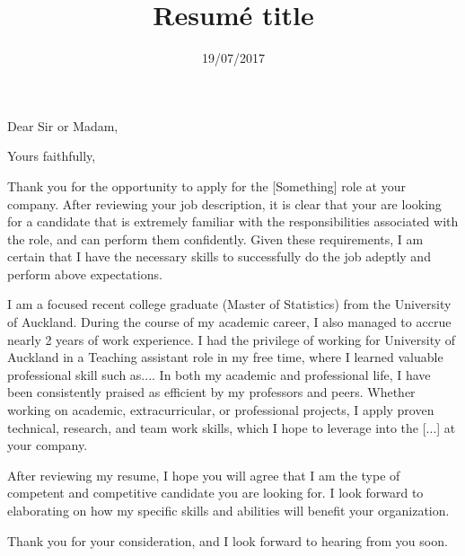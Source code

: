 \documentclass[11pt,a4paper,sans]{moderncv}        %
\title{Resumé title}                               %
\begin{document}
	\date{19/07/2017}
	\opening{Dear Sir or Madam,}
	\closing{Yours faithfully,}
	\makelettertitle
	
	Thank you for the opportunity to apply for the [Something] role at your company. After reviewing your job description, it is clear that your are looking for a candidate that is extremely familiar with the responsibilities associated with the role, and can perform them confidently. Given these requirements, I am certain that I have the necessary skills to successfully do the job adeptly and perform above expectations.
	
	
	I am a focused recent college graduate (Master of Statistics) from the University of Auckland. During the course of my academic career, I also managed to accrue nearly 2 years of work experience. I had the privilege of working for University of Auckland in a Teaching assistant role in my free time, where I learned valuable professional skill such as.... In both my academic and professional life, I have been consistently praised as efficient by my professors and peers. Whether working on academic, extracurricular, or professional projects, I apply proven technical, research, and team work skills, which I hope to leverage into the [...] at your company. 
	
	
	After reviewing my resume, I hope you will agree that I am the type of competent and competitive candidate you are looking for. I look forward to elaborating on how my specific skills and abilities will benefit your organization. 
	
	
	Thank you for your consideration, and I look forward to hearing from you soon. 
	
	\makeletterclosing
	
\end{document}
